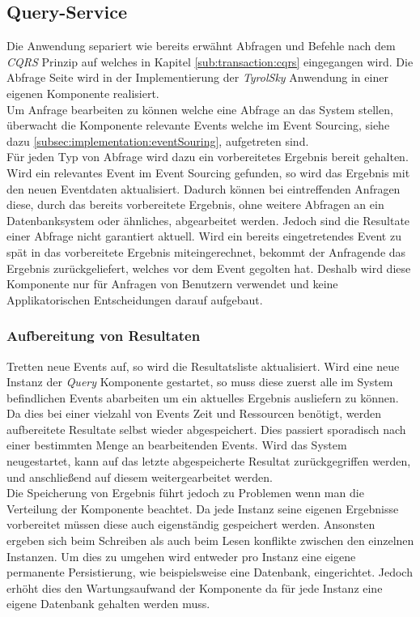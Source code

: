 \subsection{Query-Service}
Die Anwendung separiert wie bereits erwähnt Abfragen und Befehle nach dem \textit{CQRS} Prinzip auf welches in Kapitel \ref{sub:transaction:cqrs} eingegangen wird. Die Abfrage Seite wird in der Implementierung der \textit{TyrolSky} Anwendung in einer eigenen Komponente realisiert. \\
Um Anfrage bearbeiten zu können welche eine Abfrage an das System stellen, überwacht die Komponente relevante Events welche im Event Sourcing, siehe dazu \ref{subsec:implementation:eventSouring}, aufgetreten sind. \\
Für jeden Typ von Abfrage wird dazu ein vorbereitetes Ergebnis bereit gehalten. Wird ein relevantes Event im Event Sourcing gefunden, so wird das Ergebnis mit den neuen Eventdaten aktualisiert. Dadurch können bei eintreffenden Anfragen diese, durch das bereits vorbereitete Ergebnis, ohne weitere Abfragen an ein Datenbanksystem oder ähnliches, abgearbeitet werden. Jedoch sind die Resultate einer Abfrage nicht garantiert aktuell. Wird ein bereits eingetretendes Event zu spät in das vorbereitete Ergebnis miteingerechnet, bekommt der Anfragende das Ergebnis zurückgeliefert, welches vor dem Event gegolten hat. Deshalb wird diese Komponente nur für Anfragen von Benutzern verwendet und keine Applikatorischen Entscheidungen darauf aufgebaut.

\subsubsection{Aufbereitung von Resultaten}
\label{subsubsub:implementation:queryActorModel:resultPreparator}
Tretten neue Events auf, so wird die Resultatsliste aktualisiert. Wird eine neue Instanz der \textit{Query} Komponente gestartet, so muss diese zuerst alle im System befindlichen Events abarbeiten um ein aktuelles Ergebnis ausliefern zu können. Da dies bei einer vielzahl von Events Zeit und Ressourcen benötigt, werden aufbereitete Resultate selbst wieder abgespeichert. Dies passiert sporadisch nach einer bestimmten Menge an bearbeitenden Events. Wird das System neugestartet, kann auf das letzte abgespeicherte Resultat zurückgegriffen werden, und anschließend auf diesem weitergearbeitet werden. \\
Die Speicherung von Ergebnis führt jedoch zu Problemen wenn man die Verteilung der Komponente beachtet. Da jede Instanz seine eigenen Ergebnisse vorbereitet müssen diese auch eigenständig gespeichert werden. Ansonsten ergeben sich beim Schreiben als auch beim Lesen konflikte zwischen den einzelnen Instanzen. Um dies zu umgehen wird entweder pro Instanz eine eigene permanente Persistierung, wie beispielsweise eine Datenbank, eingerichtet. Jedoch erhöht dies den Wartungsaufwand der Komponente da für jede Instanz eine eigene Datenbank gehalten werden muss. \\

